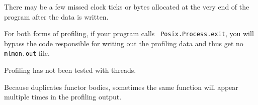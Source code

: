 There may be a few missed clock ticks or bytes allocated at the
very end of the program after the data is written.

For both forms of profiling, if your program calls {\tt
Posix.Process.exit}, you will bypass the code responsible for writing
out the profiling data and thus get no {\tt mlmon.out} file.

Profiling has not been tested with threads.

Because {\mlton} duplicates functor bodies, sometimes the same function will
appear multiple times in the profiling output.
